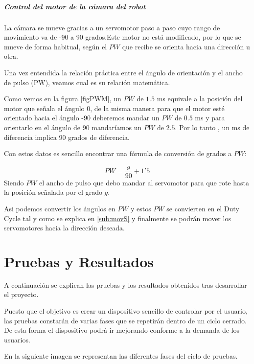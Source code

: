 \documentclass[twoside, 11pt]{epstfg}
\begin{document}
\paragraph{Control del motor de la cámara del robot}

La cámara se mueve gracias a un servomotor paso a paso cuyo rango de movimiento va de -90 a 90 grados.Este motor no está modificado, por lo que se mueve de forma habitual, según el $PW$ que recibe se orienta hacia una dirección u otra.

Una vez entendida la relación práctica entre el ángulo de orientación y el ancho de pulso (PW), veamos cual es su relación matemática.

Como vemos en la figura \ref{figPWM}, un $PW$ de $1.5$ ms equivale a la posición del motor que señala el ángulo 0, de la misma manera para que el motor esté orientado hacia el ángulo -90 deberemos mandar un $PW$ de $0.5$ ms y para orientarlo en el ángulo de 90 mandaríamos un $PW$ de $2.5$. Por lo tanto , un ms de diferencia implica 90 grados de diferencia.

Con estos datos es sencillo encontrar una fórmula de conversión de grados a $PW$:

$$PW = \frac{g}{90} + 1'5$$
Siendo $PW$ el ancho de pulso que debo mandar al servomotor para que rote hasta la posición señalada por el grado $g$.

Asi podemos convertir los ángulos en $PW$ y estos $PW$ se convierten en el Duty Cycle tal y como se explica en \ref{sub:movS} y finalmente se podrán mover los servomotores hacia la dirección deseada.


\chapter{Pruebas y Resultados}

A continuación se explican las pruebas y los resultados obtenidos tras desarrollar el proyecto.

Puesto que el objetivo es crear un dispositivo sencillo de controlar por el usuario, las pruebas constarán de varias fases que se repetirán dentro de un ciclo cerrado. De esta forma el dispositivo podrá ir mejorando conforme a la demanda de los usuarios.

En la siguiente imagen se representan las diferentes fases del ciclo de pruebas.
\end{document}

